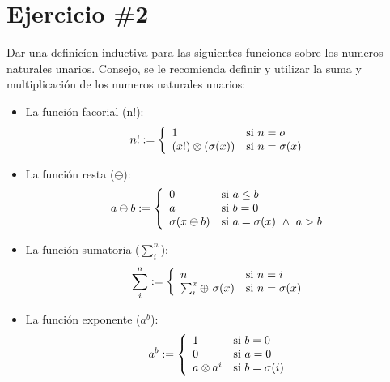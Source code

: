 \documentclass{article}
\begin{document}
\section*{Ejercicio \#2}
Dar una definicíon inductiva para las siguientes funciones sobre los numeros naturales unarios. Consejo, se le recomienda definir y utilizar la suma y multiplicación de los numeros naturales unarios:
\begin{itemize}
    \item La función facorial (n!):
    \[
        n! := \left\{
        \begin{array}{l l}
            1 & \mbox{si } n=o \\
            (x!)\otimes(\sigma(x)) & \mbox{si } n=\sigma(x) \\
        \end{array}
        \right.
    \]
    \item La función resta ($\ominus$):
    \[
        a\ominus b := \left\{
        \begin{array}{l l}
            0 & \mbox{si } a\leq b \\
            a & \mbox{si } b=0 \\
            \sigma(x\ominus b) & \mbox{si } a=\sigma(x)~\wedge ~ a>b \\
        \end{array}
        \right.
    \]
    \item La función sumatoria ($\sum_i^n$):
    \[
        \sum_i^n := \left\{
        \begin{array}{l l}
            n & \mbox{si } n=i \\
            \sum_i^x\oplus \ \sigma(x) & \mbox{si } n=\sigma(x)\\
        \end{array}
        \right.
    \]
    \item La función exponente ($a^b$):
    \[
        a^b := \left\{
        \begin{array}{l l}
            1 & \mbox{si } b=0 \\
            0 & \mbox{si } a=0 \\
            a\otimes a^i& \mbox{si } b=\sigma(i)\\
        \end{array}
        \right.
    \]
\end{itemize}
\end{document}
